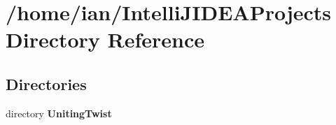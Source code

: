 \section{/home/ian/\+Intelli\+J\+I\+D\+E\+A\+Projects Directory Reference}
\label{dir_1414b14a7d21b10a6d39a04c71e54b83}
\subsection*{Directories}
\begin{DoxyCompactItemize}
\item 
directory \textbf{ Uniting\+Twist}
\end{DoxyCompactItemize}
